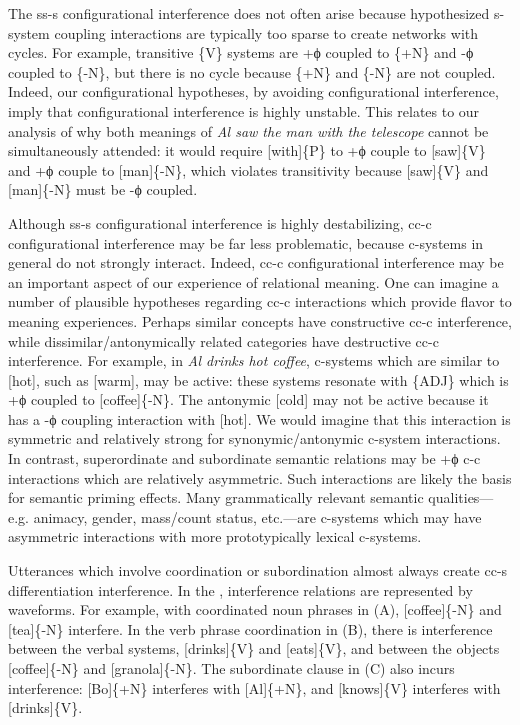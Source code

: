   The ss-s configurational interference does not often arise because hypothesized s-system coupling interactions are typically too sparse to create networks with cycles. For example, transitive \{V\} systems are +ϕ coupled to \{+N\} and -ϕ coupled to \{-N\}, but there is no cycle because \{+N\} and \{-N\} are not coupled. Indeed, our configurational hypotheses, by avoiding configurational interference, imply that configurational interference is highly unstable. This relates to our analysis of why both meanings of \textit{Al saw the man with the telescope} cannot be simultaneously attended: it would require [with]\{P\} to +ϕ couple to [saw]\{V\} and +ϕ couple to [man]\{-N\}, which violates transitivity because [saw]\{V\} and [man]\{-N\} must be -ϕ coupled. 

  Although ss-s configurational interference is highly destabilizing, cc-c configurational interference may be far less problematic, because c-systems in general do not strongly interact. Indeed, cc-c configurational interference may be an important aspect of our experience of relational meaning. One can imagine a number of plausible hypotheses regarding cc-c interactions which provide flavor to meaning experiences. Perhaps similar concepts have constructive cc-c interference, while dissimilar/antonymically related categories have destructive cc-c interference. For example, in \textit{Al drinks hot coffee}, c-systems which are similar to [hot], such as [warm], may be active: these systems resonate with \{\textsc{ADJ}\} which is +ϕ coupled to [coffee]\{-N\}. The antonymic [cold] may not be active because it has a -ϕ coupling interaction with [hot]. We would imagine that this interaction is symmetric and relatively strong for synonymic/antonymic c-system interactions. In contrast, superordinate and subordinate semantic relations may be +ϕ c-c interactions which are relatively asymmetric. Such interactions are likely the basis for semantic priming effects. Many grammatically relevant semantic qualities—e.g. animacy, gender, mass/count status, etc.—are c-systems which may have asymmetric interactions with more prototypically lexical c-systems.

  Utterances which involve coordination or subordination almost always create cc-s differentiation interference. In the {}, interference relations are represented by waveforms. For example, with coordinated noun phrases in (A), [coffee]\{-N\} and [tea]\{-N\} interfere. In the verb phrase coordination in (B), there is interference between the verbal systems, [drinks]\{V\} and [eats]\{V\}, and between the objects [coffee]\{-N\} and [granola]\{-N\}. The subordinate clause in (C) also incurs interference: [Bo]\{+N\} interferes with [Al]\{+N\}, and [knows]\{V\} interferes with [drinks]\{V\}.

